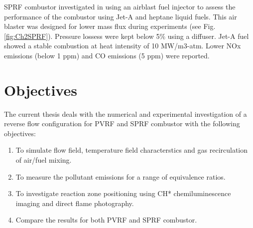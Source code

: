 SPRF combustor investigated in \cite{CJNYJS91338} using an airblast fuel injector to assess the performance of the combustor using Jet-A and heptane liquid fuels. This air blaster was designed for lower mass flux during experiments (see Fig. \ref{fig:Ch2SPRF}). Pressure lossess were kept below 5$\%$ using a diffuser. Jet-A fuel showed a stable combustion at heat intensity of 10 MW/m3-atm. Lower NOx emissions (below 1 ppm) and CO emissions (5 ppm) were reported.

\section{Objectives}
The current thesis deals with the numerical and experimental investigation of a reverse flow configuration for PVRF and SPRF combustor with the following objectives:
\begin{enumerate}
    \item To simulate flow field, temperature field characterstics and gas recirculation of air/fuel mixing. 
    \item To measure the pollutant emissions for a range of equivalence ratios.
    \item To investigate reaction zone positioning using CH* chemiluminescence imaging and direct flame photography.
    \item Compare the results for both PVRF and SPRF combustor.
\end{enumerate}
